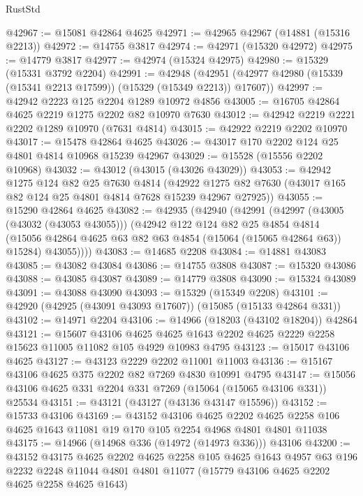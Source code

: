 \begin{lexlean}{RustStd}
\begin{coremodule}
@42967 := @15081 @42864 @4625
@42971 := @42965 @42967 (@14881 (@15316 @2213))
@42972 := @14755 @3817
@42974 := @42971 (@15320 @42972)
@42975 := @14779 @3817
@42977 := @42974 (@15324 @42975)
@42980 := @15329 (@15331 @3792 @2204)
@42991 := @42948
    (@42951 (@42977 @42980 (@15339 (@15341 @2213 @17599)) (@15329 (@15349 @2213)) @17607))
@42997 := @42942 @2223 @125 @2204 @1289 @10972 @4856
@43005 := @16705 @42864 @4625 @2219 @1275 @2202 @82 @10970 @7630
@43012 := @42942 @2219 @2221 @2202 @1289 @10970 (@7631 @4814)
@43015 := @42922 @2219 @2202 @10970
@43017 := @15478 @42864 @4625
@43026 := @43017 @170 @2202 @124 @25 @4801 @4814 @10968 @15239 @42967
@43029 := @15528 (@15556 @2202 @10968)
@43032 := @43012 (@43015 (@43026 @43029))
@43053 := @42942
    @1275
    @124
    @82
    @25
    @7630
    @4814
    (@42922 @1275 @82 @7630 (@43017 @165 @82 @124 @25 @4801 @4814 @7628 @15239 @42967 @27925))
@43055 := @15290 @42864 @4625
@43082 := @42935
    (@42940
      (@42991
        (@42997
          (@43005 (@43032 (@43053 @43055)))
          (@42942
            @122
            @124
            @82
            @25
            @4854
            @4814
            (@15056 @42864 @4625 @63 @82 @63 @4854 (@15064 (@15065 @42864 @63)) @15284)
            @43055))))
@43083 := @14685 @2208
@43084 := @14881 @43083
@43085 := @43082 @43084
@43086 := @14755 @3808
@43087 := @15320 @43086
@43088 := @43085 @43087
@43089 := @14779 @3808
@43090 := @15324 @43089
@43091 := @43088 @43090
@43093 := @15329 (@15349 @2208)
@43101 := @42920 (@42925 (@43091 @43093 @17607)) (@15085 (@15133 @42864 @331))
@43102 := @14971 @2204
@43106 := @14966 (@18203 (@43102 @18204)) @42864
@43121 := @15607
    @43106
    @4625
    @4625
    @1643
    @2202
    @4625
    @2229
    @2258
    @15623
    @11005
    @11082
    @105
    @4929
    @10983
    @4795
@43123 := @15017 @43106 @4625
@43127 := @43123 @2229 @2202 @11001 @11003
@43136 := @15167 @43106 @4625 @375 @2202 @82 @7269 @4830 @10991 @4795
@43147 := @15056 @43106 @4625 @331 @2204 @331 @7269 (@15064 (@15065 @43106 @331)) @25534
@43151 := @43121 (@43127 (@43136 @43147 @15596))
@43152 := @15733 @43106
@43169 := @43152
    @43106
    @4625
    @2202
    @4625
    @2258
    @106
    @4625
    @1643
    @11081
    @19
    @170
    @105
    @2254
    @4968
    @4801
    @4801
    @11038
@43175 := @14966 (@14968 @336 (@14972 (@14973 @336))) @43106
@43200 := @43152
    @43175
    @4625
    @2202
    @4625
    @2258
    @105
    @4625
    @1643
    @4957
    @63
    @196
    @2232
    @2248
    @11044
    @4801
    @4801
    @11077
    (@15779 @43106 @4625 @2202 @4625 @2258 @4625 @1643)

\end{coremodule}
\end{lexlean}
